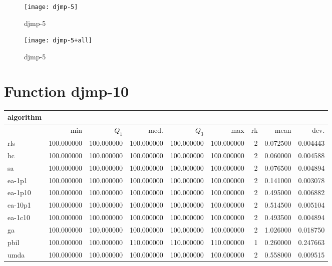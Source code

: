 \begin{center}
\begin{figure}[h]
\centering
\texttt{[image: djmp-5]}
\caption{djmp-5}
\end{figure}
\end{center}

\begin{center}
\begin{figure}[h]
\centering
\texttt{[image: djmp-5+all]}
\caption{djmp-5}
\end{figure}
\end{center}

\newpage

\section{Function djmp-10}
\begin{center}
\begin{tabular}{@{}l*{5}{>{{}}N{3}{0}}>{{}}N{2}{0}N{1}{3}N{1}{3}@{}}
\toprule
{algorithm} &  &  \\
\midrule
& {min} & {$Q_1$} & {med.} & {$Q_3$} & {max} & {rk} & {mean} & {dev.} \\
\midrule
rls & {\color{blue}} 100.000000 & {\color{blue}} 100.000000 & 100.000000 & 100.000000 & 100.000000 & 2 & 0.072500 & 0.004443 \\
 hc & {\color{blue}} 100.000000 & {\color{blue}} 100.000000 & 100.000000 & 100.000000 & 100.000000 & 2 & 0.060000 & 0.004588 \\
 sa & {\color{blue}} 100.000000 & {\color{blue}} 100.000000 & 100.000000 & 100.000000 & 100.000000 & 2 & 0.076500 & 0.004894 \\
 ea-1p1 & {\color{blue}} 100.000000 & {\color{blue}} 100.000000 & 100.000000 & 100.000000 & 100.000000 & 2 & 0.141000 & 0.003078 \\
 ea-1p10 & {\color{blue}} 100.000000 & {\color{blue}} 100.000000 & 100.000000 & 100.000000 & 100.000000 & 2 & 0.495000 & 0.006882 \\
 ea-10p1 & {\color{blue}} 100.000000 & {\color{blue}} 100.000000 & 100.000000 & 100.000000 & 100.000000 & 2 & 0.514500 & 0.005104 \\
 ea-1c10 & {\color{blue}} 100.000000 & {\color{blue}} 100.000000 & 100.000000 & 100.000000 & 100.000000 & 2 & 0.493500 & 0.004894 \\
 ga & {\color{blue}} 100.000000 & {\color{blue}} 100.000000 & 100.000000 & 100.000000 & 100.000000 & 2 & 1.026000 & 0.018750 \\
 pbil & {\color{blue}} 100.000000 & {\color{blue}} 100.000000 & {\color{blue}} 110.000000 & {\color{blue}} 110.000000 & {\color{blue}} 110.000000 & 1 & 0.260000 & 0.247663 \\
 umda & {\color{blue}} 100.000000 & {\color{blue}} 100.000000 & 100.000000 & 100.000000 & 100.000000 & 2 & 0.558000 & 0.009515 \\
 \bottomrule
\end{tabular}
\end{center}

